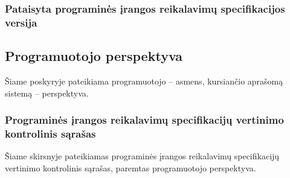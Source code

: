 \documentclass{VUMIFPSkursinis}
\begin{document}
\subsubsection{Pataisyta programinės įrangos reikalavimų specifikacijos versija}

\subsection{Programuotojo perspektyva}

Šiame poskyryje pateikiama programuotojo -- asmens, kursiančio aprašomą sistemą -- perspektyva.

\subsubsection{Programinės įrangos reikalavimų specifikacijų vertinimo kontrolinis sąrašas}

Šiame skirsnyje pateikiamas programinės įrangos reikalavimų specifikacijų vertinimo kontrolinis sąrašas,
paremtas programuotojo perspektyva.
\end{document}
